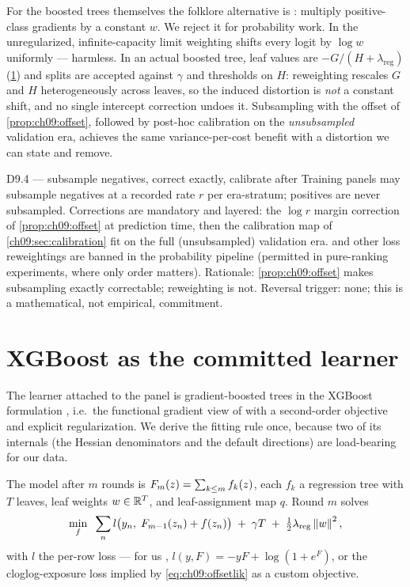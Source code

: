 For the boosted trees themselves the folklore alternative is
: multiply positive-class gradients by a
constant $w$. We reject it for probability work. In the unregularized,
infinite-capacity limit weighting shifts every logit by $\log w$
uniformly --- harmless. In an actual boosted tree, leaf values are
$-G/(H+\lambda_{\mathrm{reg}})$ (\cref{ch09:sec:xgb}) and splits are
accepted against $\gamma$ and  thresholds on
$H$: reweighting rescales $G$ and $H$ heterogeneously across leaves,
so the induced distortion is \emph{not} a constant shift, and no single
intercept correction undoes it. Subsampling with the offset of
\cref{prop:ch09:offset}, followed by post-hoc calibration on the
\emph{unsubsampled} validation era, achieves the same variance-per-cost
benefit with a distortion we can state and remove.

\begin{decision}{D9.4 --- subsample negatives, correct exactly,
calibrate after}
Training panels may subsample negatives at a recorded rate $r$ per
era-stratum; positives are never subsampled. Corrections are mandatory
and layered: the $\log r$ margin correction of \cref{prop:ch09:offset}
at prediction time, then the calibration map of
\cref{ch09:sec:calibration} fit on the full (unsubsampled) validation
era.  and other loss reweightings are banned in
the probability pipeline (permitted in pure-ranking experiments, where
only order matters). Rationale: \cref{prop:ch09:offset} makes
subsampling exactly correctable; reweighting is not. Reversal trigger:
none; this is a mathematical, not empirical, commitment.
\end{decision}

\section{XGBoost as the committed learner}\label{ch09:sec:xgb}

The learner attached to the panel is gradient-boosted trees in the
XGBoost formulation \citep{chenguestrin2016}, i.e.\ the functional
gradient view of \citet{friedman2001} with a second-order objective and
explicit regularization. We derive the fitting rule once, because two of
its internals (the Hessian denominators and the default directions) are
load-bearing for our data.

The model after $m$ rounds is $F_m(z) = \sum_{k \le m}
f_k(z)$, each $f_k$ a regression tree with $T$ leaves, leaf weights
$w \in \mathbb{R}^T$, and leaf-assignment map $q$. Round $m$ solves
\begin{equation}\label{eq:ch09:xgbobj}
\min_{f} \;\; \sum_{n} l\big(y_n,\; F_{m-1}(z_n) + f(z_n)\big)
\;+\; \gamma T \;+\; \tfrac{1}{2}\lambda_{\mathrm{reg}} \left\lVert w\right\rVert^2 ,
\end{equation}
with $l$ the per-row loss --- for us ,
$l(y, F) = -y F + \log(1 + e^{F})$, or the cloglog-exposure loss implied
by \cref{eq:ch09:offsetlik} as a custom objective.


